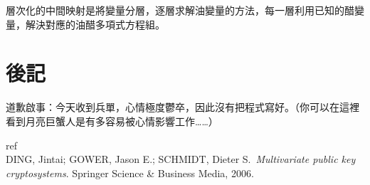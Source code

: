 \documentclass[
]{article}
\begin{document}
層次化的中間映射是將變量分層，逐層求解油變量的方法，每一層利用已知的醋變量，解決對應的油醋多項式方程組。

\hypertarget{ux5f8cux8a18}{%
\section{後記}\label{ux5f8cux8a18}}

道歉啟事：今天收到兵單，心情極度鬱卒，因此沒有把程式寫好。（你可以在這裡看到月亮巨蟹人是有多容易被心情影響工作\ldots\ldots）

ref\\
DING, Jintai; GOWER, Jason E.; SCHMIDT, Dieter S.~\emph{Multivariate
public key cryptosystems}. Springer Science \& Business Media, 2006.
\end{document}
